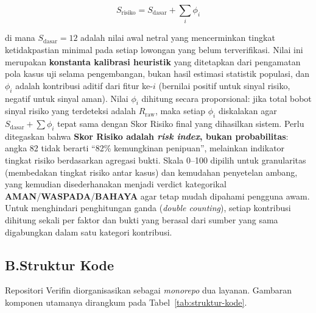 \documentclass[12pt,a4paper]{article}
\begin{document}
\begin{equation}
S_{\text{risiko}} = S_{\text{dasar}} + \sum_{i} \phi_i
\end{equation}

\noindent di mana $S_{\text{dasar}} = 12$ adalah nilai awal netral yang mencerminkan tingkat
ketidakpastian minimal pada setiap lowongan yang belum terverifikasi. Nilai ini merupakan
\textbf{konstanta kalibrasi heuristik} yang ditetapkan dari pengamatan pola kasus uji selama
pengembangan, bukan hasil estimasi statistik populasi, dan $\phi_i$ adalah kontribusi aditif dari fitur ke-$i$
(bernilai positif untuk sinyal risiko, negatif untuk sinyal aman). Nilai $\phi_i$ dihitung
secara proporsional: jika total bobot sinyal risiko yang terdeteksi adalah $R_{\text{raw}}$,
maka setiap $\phi_i$ diskalakan agar $S_{\text{dasar}} + \sum \phi_i$ tepat sama dengan
Skor Risiko final yang dihasilkan sistem. Perlu ditegaskan bahwa \textbf{Skor Risiko adalah \textit{risk index}, bukan
probabilitas}: angka 82 tidak berarti ``82\% kemungkinan penipuan'', melainkan indikator tingkat
risiko berdasarkan agregasi bukti. Skala 0--100 dipilih untuk granularitas (membedakan tingkat
risiko antar kasus) dan kemudahan penyetelan ambang, yang kemudian disederhanakan menjadi verdict
kategorikal \textbf{AMAN}/\textbf{WASPADA}/\textbf{BAHAYA} agar tetap mudah dipahami pengguna awam. Untuk menghindari
penghitungan ganda (\textit{double counting}), setiap kontribusi dihitung sekali per faktor dan
bukti yang berasal dari sumber yang sama digabungkan dalam satu kategori kontribusi.

\subsection*{B.\quad Struktur Kode}

Repositori Verifin diorganisasikan sebagai \textit{monorepo} dua layanan. Gambaran komponen utamanya dirangkum pada Tabel~\ref{tab:struktur-kode}.
\end{document}
